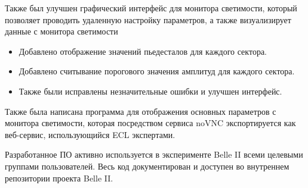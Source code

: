 \documentclass[a4paper, 14pt]{extarticle}
\let\stdsection\section
\renewcommand\section{\newpage\stdsection}
\begin{document}
    Также был улучшен графический интерфейс для монитора светимости, который позволяет проводить удаленную настройку параметров, а также визуализирует данные с монитора светимости
    \begin{itemize} 
        \item Добавлено отображение значений пьедесталов для каждого сектора.
        \item Добавлено считывание порогового значения амплитуд для каждого сектора.
        \item Также были исправлены незначительные ошибки и улучшен интерфейс.
    \end{itemize}
    
    Также была написана программа для отображения основных параметров с монитора светимости, которая посредством сервиса noVNC экспортируется как веб-сервис, использующийся ECL экспертами.\par
  Разработанное ПО активно используется в эксперименте Belle II всеми целевыми группами пользователей. Весь код документирован и доступен во внутреннем репозитории проекта Belle II.
%
 
\end{document}
